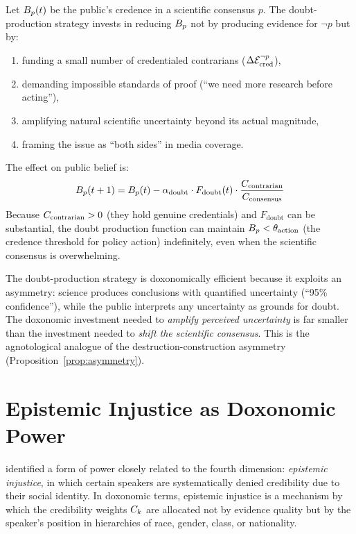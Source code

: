 \begin{model}
\label{mod:doubt}
Let $B_{p}(t)$ be the public's credence in a scientific consensus $p$.
The doubt-production strategy invests in reducing $B_{p}$ not by producing evidence for $\neg p$ but by:
\begin{enumerate}[nosep]
  \item funding a small number of credentialed contrarians ($\Delta\mathcal{E}_{\text{cred}}^{\neg p}$),
  \item demanding impossible standards of proof (``we need more research before acting''),
  \item amplifying natural scientific uncertainty beyond its actual magnitude,
  \item framing the issue as ``both sides'' in media coverage.
\end{enumerate}
The effect on public belief is:
\[
  B_{p}(t+1) = B_{p}(t) - \alpha_{\text{doubt}} \cdot F_{\text{doubt}}(t) \cdot \frac{C_{\text{contrarian}}}{C_{\text{consensus}}}
\]
Because $C_{\text{contrarian}} > 0$ (they hold genuine credentials) and $F_{\text{doubt}}$ can be substantial, the doubt production function can maintain $B_{p} < \theta_{\text{action}}$ (the credence threshold for policy action) indefinitely, even when the scientific consensus is overwhelming.
\end{model}

\begin{remark}
The doubt-production strategy is doxonomically efficient because it exploits an asymmetry: science produces conclusions with quantified uncertainty (``95\% confidence''), while the public interprets any uncertainty as grounds for doubt.
The doxonomic investment needed to \emph{amplify perceived uncertainty} is far smaller than the investment needed to \emph{shift the scientific consensus}.
This is the agnotological analogue of the destruction-construction asymmetry (Proposition~\ref{prop:asymmetry}).
\end{remark}


\section{Epistemic Injustice as Doxonomic Power}
\label{sec:ch9-epistemic-injustice}

\textcite{fricker2007} identified a form of power closely related to the fourth dimension: \emph{epistemic injustice}, in which certain speakers are systematically denied credibility due to their social identity.
In doxonomic terms, epistemic injustice is a mechanism by which the credibility weights $C_{k}$ are allocated not by evidence quality but by the speaker's position in hierarchies of race, gender, class, or nationality.

